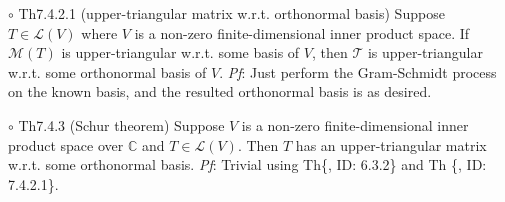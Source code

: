 \documentclass{article}
\begin{document}
\begin{Th}{$\circ$ Th7.4.2.1 (upper-triangular matrix w.r.t. orthonormal basis)}
    Suppose $T\in\mathcal{L}(V)$ where $V$ is a non-zero finite-dimensional inner product space. If $\mathcal{M}(T)$ is upper-triangular w.r.t. some basis of $V$, then $\mathcal{T}$ is upper-triangular w.r.t. some orthonormal basis of $V$.
    \tcblower
    \textit{Pf}: Just perform the Gram-Schmidt process on the known basis, and the resulted orthonormal basis is as desired.
\end{Th}

\begin{Th}{$\circ$ Th7.4.3 (Schur theorem)}
    Suppose $V$ is a non-zero finite-dimensional inner product space over $\mathbb{C}$ and $T\in\mathcal{L}(V)$. Then $T$ has an upper-triangular matrix w.r.t. some orthonormal basis.
    \tcblower
    \textit{Pf}: Trivial using Th\{, ID: 6.3.2\} and Th \{, ID: 7.4.2.1\}.
\end{Th}
\end{document}
